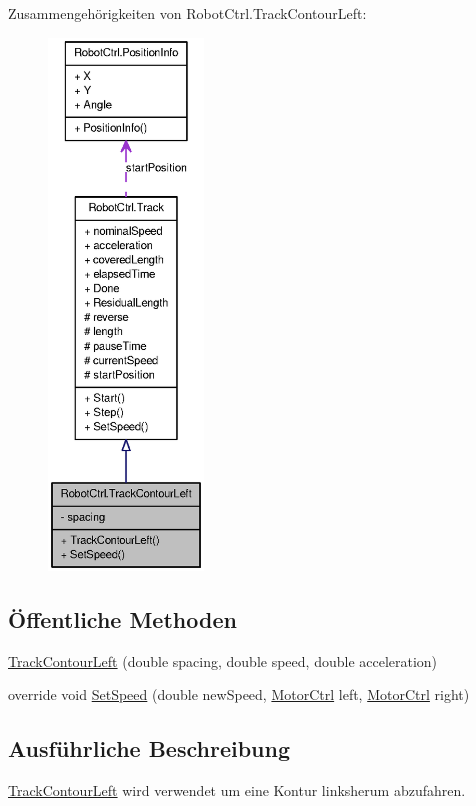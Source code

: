 Zusammengehörigkeiten von RobotCtrl.TrackContourLeft:\nopagebreak
\begin{figure}[H]
\begin{center}
\leavevmode
\includegraphics[height=400pt]{class_robot_ctrl_1_1_track_contour_left__coll__graph}
\end{center}
\end{figure}
\subsection*{Öffentliche Methoden}
\begin{DoxyCompactItemize}
\item 
\hyperlink{class_robot_ctrl_1_1_track_contour_left_a73c01532abc01420c2a35bea80be194d}{TrackContourLeft} (double spacing, double speed, double acceleration)
\item 
override void \hyperlink{class_robot_ctrl_1_1_track_contour_left_ae7938250af614625cd08a498c0f15195}{SetSpeed} (double newSpeed, \hyperlink{class_robot_ctrl_1_1_motor_ctrl}{MotorCtrl} left, \hyperlink{class_robot_ctrl_1_1_motor_ctrl}{MotorCtrl} right)
\end{DoxyCompactItemize}


\subsection{Ausführliche Beschreibung}
\hyperlink{class_robot_ctrl_1_1_track_contour_left}{TrackContourLeft} wird verwendet um eine Kontur linksherum abzufahren. 

